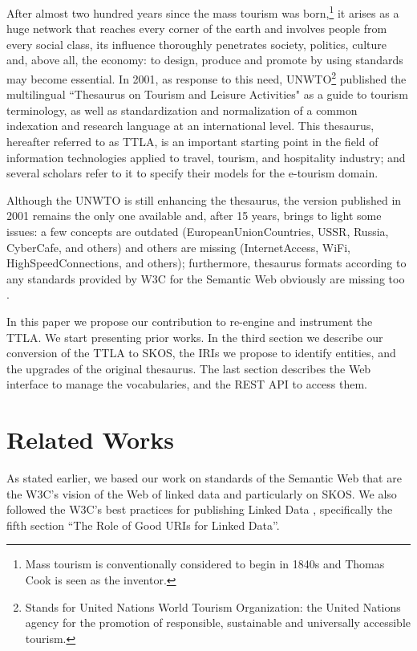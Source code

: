 \documentclass[runningheads,a4paper]{llncs}
\begin{document}
After almost two hundred years since the mass tourism was born,\footnote{ Mass tourism is conventionally considered to begin in 1840s and Thomas Cook is seen as the inventor.} it arises as a huge network that reaches every corner of the earth and involves people from every social class, its influence thoroughly penetrates society, politics, culture and, above all, the economy: to design, produce and promote by using standards may become essential. In 2001, as response to this need, UNWTO\footnote{ Stands for United Nations World Tourism Organization: the United Nations agency for the promotion of responsible, sustainable and universally accessible tourism.} published the multilingual ``Thesaurus on Tourism and Leisure Activities"  \cite{_Ref364511122} as a guide to tourism terminology, as well as standardization and normalization of a common indexation and research language at an international level. This thesaurus, hereafter referred to as TTLA, is an important starting point in the field of information technologies applied to travel, tourism, and hospitality industry; and several scholars refer to it to specify their models for the e-tourism domain.

Although the UNWTO is still enhancing the thesaurus, the version published in 2001 remains the only one available and, after 15 years, brings to light some issues: a few concepts are outdated (EuropeanUnionCountries, USSR, Russia, CyberCafe, and others) and others are missing (InternetAccess, WiFi, HighSpeedConnections, and others); furthermore, thesaurus formats according to any standards provided by W3C for the Semantic Web obviously are missing too  \cite{_Ref364511146}.

In this paper we propose our contribution to re-engine and instrument the TTLA. We start presenting prior works. In the third section we describe our conversion of the TTLA to SKOS, the IRIs we propose to identify entities, and the upgrades of the original thesaurus. The last section describes the Web interface to manage the vocabularies, and the REST API to access them. 

\section{Related Works}

As stated earlier, we based our work on standards of the Semantic Web that are the W3C's vision of the Web of linked data and particularly on SKOS. We also followed the W3C's best practices for publishing Linked Data  \cite{_Ref364511178}, specifically the fifth section ``The Role of Good URIs for Linked Data''.
\end{document}
